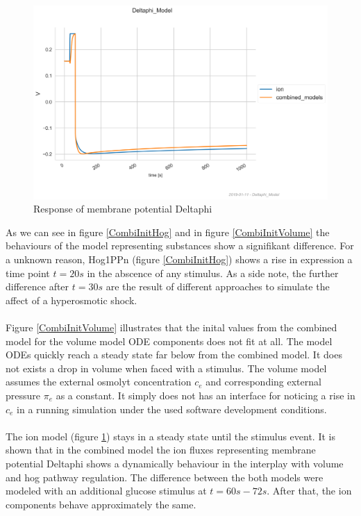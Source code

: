 \begin{figure}[h!]
	\begin{center}
		\begin{minipage}{0,8\textwidth}
			
			\includegraphics[width=\textwidth]{picture/Deltaphi_11.png}
			\caption{Response of membrane potential Deltaphi} 
			\label{CombiInitIon} 
		\end{minipage}
	\end{center}
\end{figure}
As we can see in figure \ref{CombiInitHog} and in figure \ref{CombiInitVolume} the behaviours of the model representing substances show a signifikant difference. For a unknown reason, Hog1PPn (figure \ref{CombiInitHog}) shows a rise in expression a time point $t=20s$ in the abscence of any stimulus. As a side note, the further difference after $t=30s$ are the result of different approaches to simulate the affect of a hyperosmotic shock. \\\\
Figure \ref{CombiInitVolume} illustrates that the inital values from the combined model for the volume model ODE components does not fit at all. The model 
ODEs quickly reach a steady state far below from the combined model. It does not exists a drop in volume when faced with a stimulus. The volume model assumes the external osmolyt concentration $c_e$ and corresponding external pressure $\pi_e$ as a constant. It simply does not has an interface for noticing a rise in $c_e$ in a running simulation under the used software development conditions.\\\\
The ion model (figure \ref{CombiInitIon}) stays in a steady state until the stimulus event. It is shown that in the combined model the ion fluxes representing membrane potential Deltaphi shows a dynamically behaviour in the interplay with volume and hog pathway regulation. The difference between the both models were modeled with an additional glucose stimulus at $t=60s-72s$. After that, the ion components behave approximately the same.
\newpage
